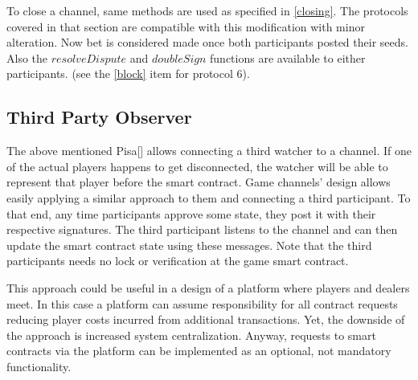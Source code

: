 To close a channel, same methods are used as specified in \autoref{closing}. The protocols covered in that section are compatible with this modification with minor alteration. Now bet is considered made once both participants posted their seeds. Also the  $resolveDispute$ and $doubleSign$ functions are available to either participants. (see the \ref{block} item for protocol 6). 

\subsection{Third Party Observer}

The above mentioned Pisa[] allows connecting a third watcher to a channel. If one of the actual players happens to get disconnected, the watcher will be able to represent that player before the smart contract. Game channels’ design allows easily applying a similar approach to them and connecting a third participant. To that end, any time participants approve some state, they post it with their respective signatures. The third participant listens to the channel and can then update the smart contract state using these messages. Note that the third participants needs no lock or verification at the game smart contract. 

This approach could be useful in a design of a platform where players and dealers meet. In this case a platform can assume responsibility for all contract requests reducing player costs incurred from additional transactions. Yet, the downside of the approach is increased system centralization. Anyway, requests to smart contracts via the platform can be implemented as an optional, not mandatory functionality.

